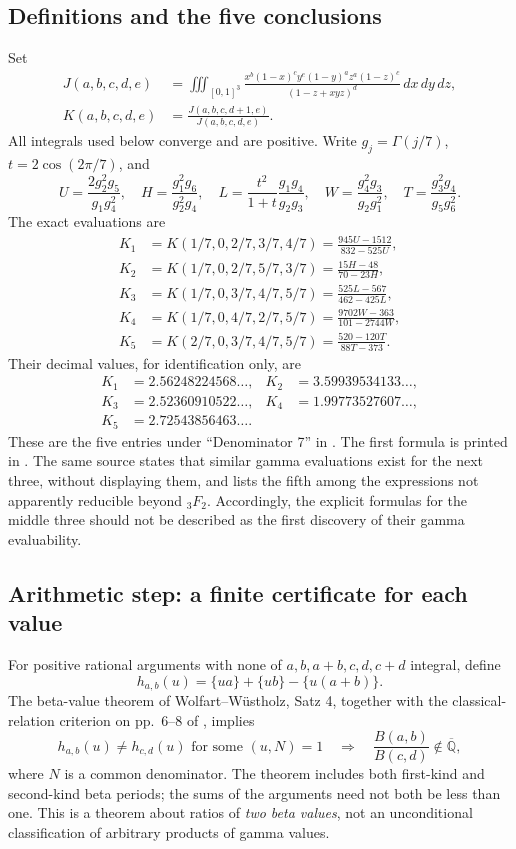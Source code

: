 \documentclass[11pt,a4paper]{article}
\theoremstyle{definition}
\theoremstyle{remark}
\numberwithin{equation}{section}
\newcommand{\Qbar}{\overline{\mathbb Q}}
\newcommand{\F}[2]{{}_{#1}F_{#2}}
\begin{document}
\subsection{Definitions and the five conclusions}
Set
\begin{align*}
J(a,b,c,d,e)&=\iiint_{[0,1]^3}
\frac{x^b(1-x)^cy^e(1-y)^az^a(1-z)^c}{(1-z+xyz)^d}
\,dx\,dy\,dz,\\
K(a,b,c,d,e)&=\frac{J(a,b,c,d+1,e)}{J(a,b,c,d,e)}.
\end{align*}
All integrals used below converge and are positive. Write
\(g_j=\Gamma(j/7)\), \(t=2\cos(2\pi/7)\), and
\[
U=\frac{2g_2^2g_5}{g_1g_4^2},\quad
H=\frac{g_1^2g_6}{g_2^2g_4},\quad
L=\frac{t^2}{1+t}\frac{g_1g_4}{g_2g_3},\quad
W=\frac{g_4^2g_3}{g_2g_1^2},\quad
T=\frac{g_3^2g_4}{g_5g_6^2}.
\]
The exact evaluations are
\begin{align*}
K_1&=K(1/7,0,2/7,3/7,4/7)=\frac{945U-1512}{832-525U},\\
K_2&=K(1/7,0,2/7,5/7,3/7)=\frac{15H-48}{70-23H},\\
K_3&=K(1/7,0,3/7,4/7,5/7)=\frac{525L-567}{462-425L},\\
K_4&=K(1/7,0,4/7,2/7,5/7)=\frac{9702W-363}{101-2744W},\\
K_5&=K(2/7,0,3/7,4/7,5/7)=\frac{520-120T}{88T-373}.
\end{align*}
Their decimal values, for identification only, are
\begin{align*}
K_1&=2.56248224568\ldots,& K_2&=3.59939534133\ldots,\\
K_3&=2.52360910522\ldots,& K_4&=1.99773527607\ldots,\\
K_5&=2.72543856463\ldots.
\end{align*}
These are the five entries under ``Denominator 7'' in \cite{extra8-dbkz}.
The first formula is printed in \cite{extra8-zudilin}. The same source states that
similar gamma evaluations exist for the next three, without displaying them,
and lists the fifth among the expressions not apparently reducible beyond
\(\F32\). Accordingly, the explicit formulas for the middle three should
not be described as the first discovery of their gamma evaluability.

\subsection{Arithmetic step: a finite certificate for each value}
For positive rational arguments with none of \(a,b,a+b,c,d,c+d\) integral,
define
\[
h_{a,b}(u)=\{ua\}+\{ub\}-\{u(a+b)\}.
\]
The beta-value theorem of Wolfart--W\"ustholz, Satz 4, together with the
classical-relation criterion on pp.~6--8 of \cite{dbkz-ww}, implies
\[
h_{a,b}(u)\ne h_{c,d}(u)\text{ for some }(u,N)=1
\quad\Longrightarrow\quad
\frac{B(a,b)}{B(c,d)}\notin\Qbar,
\]
where \(N\) is a common denominator. The theorem includes both first-kind
and second-kind beta periods; the sums of the arguments need not both be
less than one. This is a theorem about ratios of \emph{two beta values}, not
an unconditional classification of arbitrary products of gamma values.
\end{document}
